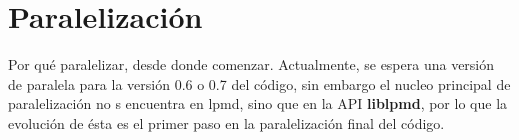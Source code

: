 \chapter{Paralelizaci\'on}

Por qu\'e paralelizar, desde donde comenzar. Actualmente, se espera una versi\'on de \lpmd paralela para la versi\'on 0.6 o 0.7 del c\'odigo, sin embargo el nucleo principal de paralelizaci\'on no s encuentra en lpmd, sino que en la API \textbf{liblpmd}, por lo que la evoluci\'on de \'esta es el primer paso en la paralelizaci\'on final del c\'odigo.
